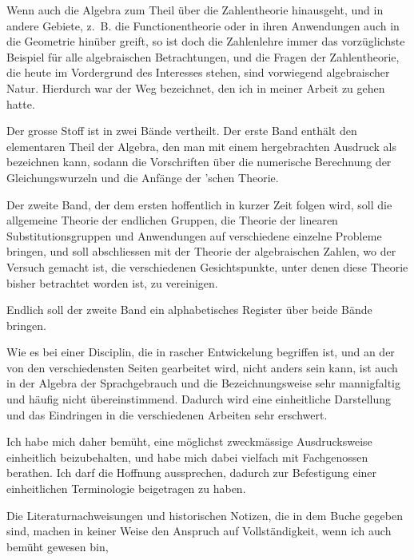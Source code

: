 \noindent Wenn auch die Algebra zum Theil über die Zahlentheorie hinausgeht, und in andere Gebiete, z.~B. die Functionentheorie oder in ihren Anwendungen auch in die Geometrie hinüber greift, so ist doch die Zahlenlehre immer das vorzüglichste Beispiel für alle algebraischen Betrachtungen, und die Fragen der Zahlentheorie, die heute im Vordergrund des Interesses stehen, sind vorwiegend algebraischer Natur. Hierdurch war der Weg bezeichnet, den ich in meiner Arbeit zu gehen hatte.

Der grosse Stoff ist in zwei Bände vertheilt. Der erste Band enthält den elementaren Theil der Algebra, den man mit einem hergebrachten Ausdruck als  bezeichnen kann, sodann die Vorschriften über die numerische Berechnung der Gleichungswurzeln und die Anfänge der 'schen Theorie.

Der zweite Band, der dem ersten hoffentlich in kurzer Zeit folgen wird, soll die allgemeine Theorie der endlichen Gruppen, die Theorie der linearen Substitutionsgruppen und Anwendungen auf verschiedene einzelne Probleme bringen, und soll abschliessen mit der Theorie der algebraischen Zahlen, wo der Versuch gemacht ist, die verschiedenen Gesichtspunkte, unter denen diese Theorie bisher betrachtet worden ist, zu vereinigen.

Endlich soll der zweite Band ein alphabetisches Register über beide Bände bringen.

Wie es bei einer Disciplin, die in rascher Entwickelung begriffen ist, und an der von den verschiedensten Seiten gearbeitet wird, nicht anders sein kann, ist auch in der Algebra der Sprachgebrauch und die Bezeichnungsweise sehr mannigfaltig und häufig nicht übereinstimmend. Dadurch wird eine einheitliche Darstellung und das Eindringen in die verschiedenen Arbeiten sehr erschwert.

Ich habe mich daher bemüht, eine möglichst zweckmässige Ausdrucksweise einheitlich beizubehalten, und habe mich dabei vielfach mit Fachgenossen berathen. Ich darf die Hoffnung aussprechen, dadurch zur Befestigung einer einheitlichen Terminologie beigetragen zu haben.

Die Literaturnachweisungen und historischen Notizen, die in dem Buche gegeben sind, machen in keiner Weise den Anspruch auf Vollständigkeit, wenn ich auch bemüht gewesen bin,
